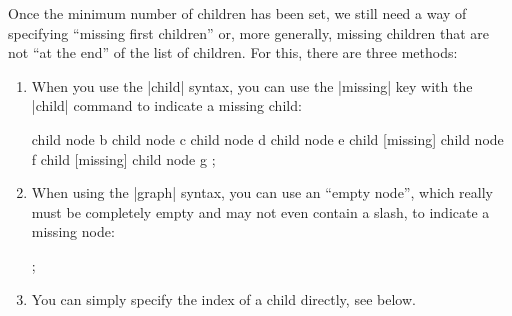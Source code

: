 Once the minimum number of children has been set, we still need a way
of specifying ``missing first children'' or, more generally, missing
children that are not ``at the end'' of the list of children. For
this, there are three methods:

\begin{enumerate}
\item When you use the |child| syntax, you can use the |missing| key
  with the |child| command to indicate a missing child:
\begin{codeexample}[]
\tikz [binary tree layout, level distance=5mm]
child { node {b}
  child { node {c}
    child { node {d} }
} }
child { node {e}
  child [missing]
  child { node {f}
    child [missing]
    child { node {g}
} } };
\end{codeexample}
\item When using the |graph| syntax, you can use an ``empty node'',
  which really must be completely empty and may not even contain a
  slash, to indicate a missing node:
\begin{codeexample}[]
\tikz [binary tree layout, level distance=5mm]
;
\end{codeexample}
\item You can simply specify the index of a child directly, see below.
\end{enumerate}

